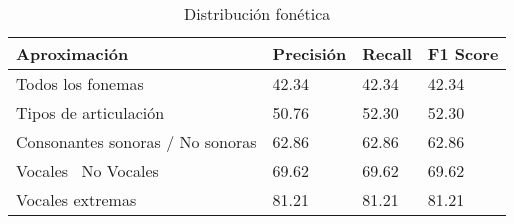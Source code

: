 \begin{table}[H]
\centering
\caption{Distribución fonética}
\label{tab:resultados_arboles}
\begin{tabular}{|l|l|l|l|}
\hline
Aproximación                     & Precisión & Recall & F1 Score \\ \hline
Todos los fonemas                & 42.34     & 42.34  & 42.34    \\ \hline
Tipos de articulación            & 50.76     & 52.30  & 52.30    \\ \hline
Consonantes sonoras / No sonoras & 62.86     & 62.86  & 62.86    \\ \hline
Vocales \ No Vocales             & 69.62     & 69.62  & 69.62    \\ \hline
Vocales extremas                 & 81.21     & 81.21  & 81.21    \\ \hline


\end{tabular}
\end{table}